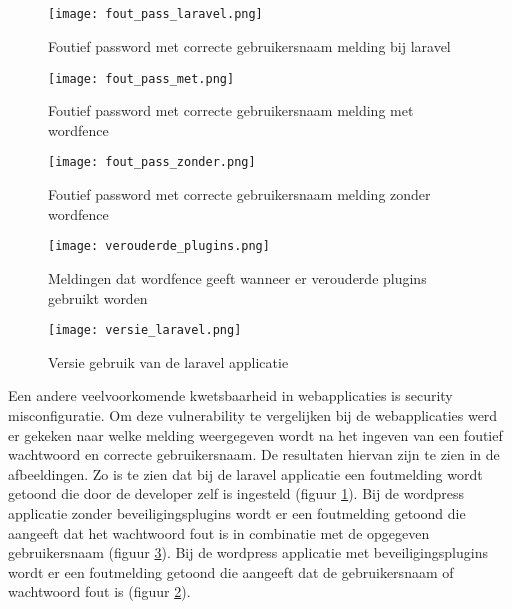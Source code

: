 \subsection{}
\begin{figure}
    \centering
    \texttt{[image: fout\_pass\_laravel.png]}
    \caption[Foutief password met correcte gebruikersnaam melding bij laravel]{Foutief password met correcte gebruikersnaam melding bij laravel}
    \label{fig:sec_mis_laravel}
\end{figure}
\begin{figure}
    \centering
    \texttt{[image: fout\_pass\_met.png]}
    \caption[Foutief password met correcte gebruikersnaam melding met wordfence]{Foutief password met correcte gebruikersnaam melding met wordfence}
    \label{fig:sec_mis_met}
\end{figure}
\begin{figure}
    \centering
    \texttt{[image: fout\_pass\_zonder.png]}
    \caption[Foutief password met correcte gebruikersnaam melding zonder wordefence]{Foutief password met correcte gebruikersnaam melding zonder wordfence}
    \label{fig:sec_mis_zonder}
\end{figure}
\begin{figure}
    \centering
    \texttt{[image: verouderde\_plugins.png]}
    \caption[Meldingen dat wordfence geeft wanneer er verouderde plugins gebruikt worden]{Meldingen dat wordfence geeft wanneer er verouderde plugins gebruikt worden}
    \label{fig:verouderde_plugins}
\end{figure}
\begin{figure}
    \centering
    \texttt{[image: versie\_laravel.png]}
    \caption[Versie gebruik van de laravel applicatie]{Versie gebruik van de laravel applicatie}
    \label{fig:versie_laravel}
\end{figure}
Een andere veelvoorkomende kwetsbaarheid in webapplicaties is security misconfiguratie. Om deze vulnerability te vergelijken 
bij de webapplicaties werd er gekeken naar welke melding weergegeven wordt na het ingeven van een foutief wachtwoord
en correcte gebruikersnaam. De resultaten hiervan zijn te zien in de afbeeldingen. Zo is te zien dat bij de laravel 
applicatie een foutmelding wordt getoond die door de developer zelf is ingesteld (figuur \ref{fig:sec_mis_laravel}). Bij de wordpress 
applicatie zonder beveiligingsplugins wordt er een foutmelding getoond die aangeeft dat het wachtwoord fout is in combinatie 
met de opgegeven gebruikersnaam (figuur \ref{fig:sec_mis_zonder}). Bij de wordpress applicatie met beveiligingsplugins wordt er een 
foutmelding getoond die aangeeft dat de gebruikersnaam of wachtwoord fout is (figuur \ref{fig:sec_mis_met}).

